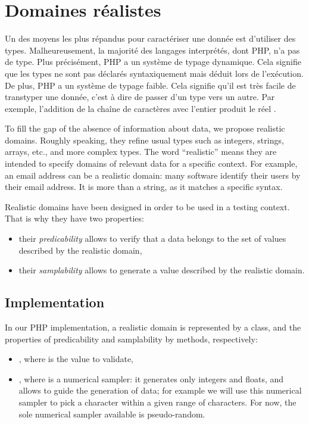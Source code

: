 \section{Domaines réalistes}
\label{section:language:realdoms}

Un des moyens les plus répandus pour caractériser une donnée est d'utiliser des
types. Malheureusement, la majorité des langages interprétés, dont PHP, n'a pas
de type. Plus précisément, PHP a un système de typage dynamique. Cela signifie
que les types ne sont pas déclarés syntaxiquement mais déduit lors de
l'exécution. De plus, PHP a un système de typage faible. Cela signifie qu'il est
très facile de transtyper une donnée, c'est à dire de passer d'un type vers un
autre. Par exemple, l'addition de la chaîne de caractères  avec
l'entier  produit le réel .

To fill the gap of the absence of information about data, we propose realistic
domains. Roughly speaking, they refine usual types such as integers, strings,
arrays, etc., and more complex types. The word ``realistic'' means they are
intended to specify domains of relevant data for a specific context. For
example, an email address can be a realistic domain: many software identify
their users by their email address. It is more than a string, as it matches a
specific syntax.

Realistic domains have been designed in order to be used in a testing context.
That is why they have two properties:
\begin{itemize}
\item their {\em predicability} allows to verify that a data belongs to the set
of values described by the realistic domain,
\item their {\em samplability} allows to generate a value described by the
realistic domain.
\end{itemize}

\subsection{Implementation}
\label{realdom:implementation:sec}

In our PHP implementation, a realistic domain is represented by a class, and the
properties of predicability and samplability by methods, respectively:
\begin{itemize}
\item {}, where  is the value to validate,
\item {}, where  is a numerical sampler:
it generates only integers and floats, and allows to guide the generation of
data; for example we will use this numerical sampler to pick a character within
a given range of characters. For now, the sole numerical sampler available is
pseudo-random.
\end{itemize}

